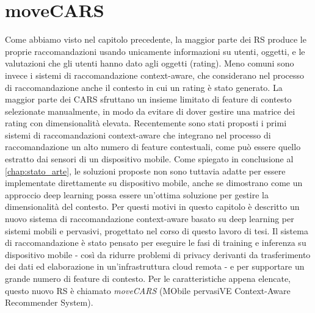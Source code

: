 \documentclass[12pt,italian]{report}
\begin{document}
\chapter{moveCARS}
\label{chap:classificatore}
Come abbiamo visto nel capitolo precedente, la maggior parte dei RS produce le proprie raccomandazioni usando unicamente informazioni su utenti, oggetti, e le valutazioni che gli utenti hanno dato agli oggetti (rating). Meno comuni sono invece i sistemi di raccomandazione context-aware, che considerano nel processo di raccomandazione anche il contesto in cui un rating è stato generato. La maggior parte dei CARS sfruttano un insieme limitato di feature di contesto selezionate manualmente, in modo da evitare di dover gestire una matrice dei rating con dimensionalità elevata. Recentemente sono stati proposti i primi sistemi di raccomandazioni context-aware che integrano nel processo di raccomandazione un alto numero di feature contestuali, come può essere quello estratto dai sensori di un dispositivo mobile. Come spiegato in conclusione al \autoref{chap:stato_arte}, le soluzioni proposte non sono tuttavia adatte per essere implementate direttamente su dispositivo mobile, anche se dimostrano come un approccio deep learning possa essere un'ottima soluzione per gestire la dimensionalità del contesto. Per questi motivi in questo capitolo è descritto un nuovo sistema di raccomandazione context-aware basato su deep learning per sistemi mobili e pervasivi, progettato nel corso di questo lavoro di tesi. Il sistema di raccomandazione è stato pensato per eseguire le fasi di training e inferenza su dispositivo mobile - così da ridurre problemi di privacy derivanti da trasferimento dei dati ed elaborazione in un'infrastruttura cloud remota - e per supportare un grande numero di feature di contesto. Per le caratteristiche appena elencate, questo nuovo RS è chiamato \textit{moveCARS} (MObile pervasiVE Context-Aware Recommender System).
\end{document}
